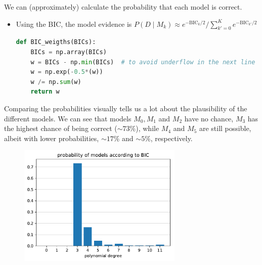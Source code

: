 \newpage
\no We can (approximately) calculate the probability that each model is correct.
\begin{itemize}
\item Using the BIC, the model evidence is $P(D\;|\;M_k) \approx e^{-\text{BIC}_k/2} / \sum_{k'=0}^Ke^{-\text{BIC}_{k'}/2}$
\begin{lstlisting}[language=python]
def BIC_weigths(BICs):
	BICs = np.array(BICs)
	w = BICs - np.min(BICs)  # to avoid underflow in the next line
	w = np.exp(-0.5*(w))  
	w /= np.sum(w)
	return w
\end{lstlisting}
\end{itemize}

\no Comparing the probabilities visually tells us a lot about the plausibility of the different models. We can see that models $M_0, M_1$ and $M_2$ have no chance, $M_3$ has the highest chance of being correct ($\sim 73\%$), while $M_4$ and $M_5$ are still possible, albeit with lower probabilities, $\sim 17\%$ and $\sim 5\%$, respectively.
\begin{figure}[h]
	\centering
	\includegraphics[width=0.7\textwidth]{./figs/03-linear-regression-BIC-weights.pdf}
\end{figure}


